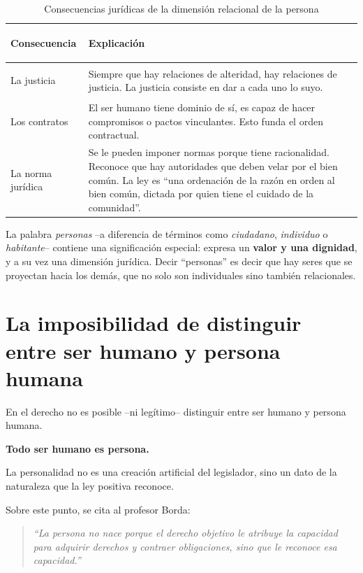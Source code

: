 \documentclass[12pt,oneside]{book}
\begin{document}
\begin{table}[H]
\centering
\begin{tabularx}{\textwidth}{>{\bfseries\raggedright\arraybackslash}p{} X}
\toprule
\textbf{Consecuencia} & \textbf{Explicación} \\
\midrule
La justicia & Siempre que hay relaciones de alteridad, hay relaciones de justicia. La justicia consiste en dar a cada uno lo suyo. \\
Los contratos & El ser humano tiene dominio de sí, es capaz de hacer compromisos o pactos vinculantes. Esto funda el orden contractual. \\
La norma jurídica & Se le pueden imponer normas porque tiene racionalidad. Reconoce que hay autoridades que deben velar por el bien común. La ley es ``una ordenación de la razón en orden al bien común, dictada por quien tiene el cuidado de la comunidad''. \\
\bottomrule
\end{tabularx}
\caption{Consecuencias jurídicas de la dimensión relacional de la persona}
\end{table}

La palabra \emph{personas} --a diferencia de términos como \emph{ciudadano}, \emph{individuo} o \emph{habitante}-- contiene una significación especial: expresa un \textbf{valor y una dignidad}, y a su vez una dimensión jurídica. Decir ``personas'' es decir que hay seres que se proyectan hacia los demás, que no solo son individuales sino también relacionales.

\section{La imposibilidad de distinguir entre ser humano y persona humana}

\begin{important}
En el derecho no es posible --ni legítimo-- distinguir entre ser humano y persona humana.

\textbf{Todo ser humano es persona.}

La personalidad no es una creación artificial del legislador, sino un dato de la naturaleza que la ley positiva reconoce.
\end{important}

Sobre este punto, se cita al profesor Borda:

\begin{quote}
\textit{``La persona no nace porque el derecho objetivo le atribuye la capacidad para adquirir derechos y contraer obligaciones, sino que le reconoce esa capacidad.''}
\end{quote}
\end{document}
